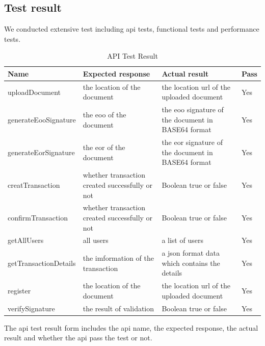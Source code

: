 \documentclass[runningheads]{llncs}
\begin{document}
\subsection{Test result}
We conducted extensive test including api tests, functional tests and performance tests.
	\begin{table}[H] %
    	\centering
    	\caption{API Test Result}
    	\label{table:API Test Result} 
    	\begin{threeparttable}
    		\begin{tabular} {p{3.2cm}|p{3.8cm}|p{3.8cm}|p{1.0cm}<{\centering}}    	
    		\toprule
      		Name & Expected response &  Actual result &  Pass  \\
      		\midrule
        	uploadDocument & the location of the document & the location url of the uploaded document & Yes \\
        	\hline
        	generateEooSignature & the eoo of the document & the eoo signature of the document in BASE64 format & Yes \\
        	\hline
        	generateEorSignature & the eor of the document & the eor signature of the document in BASE64 format & Yes \\
        	\hline
        	creatTransaction & whether transaction created successfully or not & Boolean true or false & Yes \\
        	\hline
        	confirmTransaction & whether transaction created successfully or not & Boolean true or false & Yes \\
        	\hline
        	getAllUsers & all users & a list of users & Yes \\
        	\hline
        	getTransactionDetails & the imformation of the transaction & a json format data which contains the details & Yes \\
        	\hline
        	register & the location of the document & the location url of the uploaded document & Yes \\
        	\hline
        	verifySignature & the result of validation & Boolean true or false & Yes \\

      		\bottomrule
    		\end{tabular}
    		\begin{tablenotes}
          		\footnotesize
          		\item The api test result form includes the api name, the expected response, the actual result and whether the api pass the test or not. 
        	\end{tablenotes}
    	\end{threeparttable}   
	\end{table}
	
\end{document}
